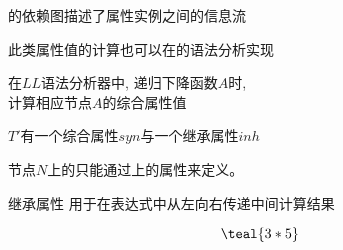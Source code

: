 \begin{frame}{}
  \begin{center}
    的依赖图描述了属性实例之间的信息流

    \vspace{0.80cm}
    此类属性值的计算也可以在的语法分析实现

    \pause
    \vspace{0.80cm}
    在$LL$语法分析器中, 递归下降函数$A$时, \\
    计算相应节点$A$的综合属性值
  \end{center}
\end{frame}

\begin{frame}{}
  \begin{center}
    $T'$有一个综合属性$syn$与一个继承属性$inh$


    \begin{definition}
      节点$N$上的只能通过上的属性来定义。
    \end{definition}
  \end{center}
\end{frame}

\begin{frame}{}
  \begin{center}
    继承属性  用于在表达式中从左向右传递中间计算结果

    \vspace{0.50cm}
    \[
        \teal{3 \ast 5}
    \]


    \pause
  \end{center}
\end{frame}

